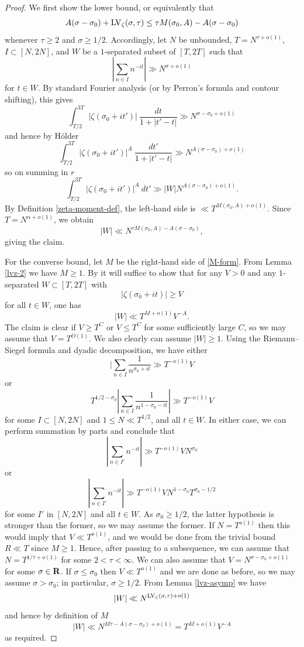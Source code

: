 \begin{proof}  We first show the lower bound, or equivalently that
$$ A(\sigma-\sigma_0) + \mathrm{LV}_\zeta(\sigma,\tau) \leq \tau M(\sigma_0,A) - A(\sigma-\sigma_0)$$
whenever $\tau \geq 2$ and $\sigma \geq 1/2$.  Accordingly, let $N$ be unbounded, $T = N^{\tau+o(1)}$, $I \subset [N,2N]$, and $W$ be a $1$-separated subset of $[T,2T]$ such that
$$ |\sum_{n \in I} n^{-it}| \gg N^{\sigma+o(1)}$$
for $t \in W$. By standard Fourier analysis (or by Perron's formula and contour shifting), this gives
$$ \int_{T/2}^{3T} |\zeta(\sigma_0+it')|\ \frac{dt}{1+|t'-t|} \gg N^{\sigma - \sigma_0 + o(1)}$$
and hence by H\"older
$$ \int_{T/2}^{3T} |\zeta(\sigma_0+it')|^A\ \frac{dt'}{1+|t'-t|} \gg N^{A(\sigma - \sigma_0) + o(1)}$$
so on summing in $r$
$$ \int_{T/2}^{3T} |\zeta(\sigma_0+it')|^A\ dt' \gg |W| N^{A(\sigma - \sigma_0) + o(1)}.$$
By Definition \ref{zeta-moment-def}, the left-hand side is $\ll T^{M(\sigma_0,A)+o(1)}$.  Since $T = N^{\alpha+o(1)}$, we obtain
$$ |W| \ll N^{\tau M(\sigma_0,A) - A(\sigma-\sigma_0)},$$
giving the claim.

For the converse bound, let $M$ be the right-hand side of \eqref{M-form}.  From Lemma \ref{lvz-2} we have $M \geq 1$. By \cite[\S 8.1]{ivic} it will suffice to show that for any $V>0$ and any $1$-separated $W \subset [T,2T]$ with
$$ |\zeta(\sigma_0+it)| \geq V$$
for all $t \in W$, one has
$$ |W| \ll T^{M+o(1)} V^{-A}.$$
The claim is clear if $V \geq T^C$ or $V \leq T^C$ for some sufficiently large $C$, so we may assume that $V = T^{O(1)}$.  We also clearly can assume $|W|\geq 1$.  Using the Riemann--Siegel formula \cite[Theorem 4.1]{ivic} and dyadic decomposition, we have either
$$ |\sum_{n \in I} \frac{1}{n^{\sigma_0+it}} \gg T^{-o(1)} V$$
or
$$ T^{1/2-\sigma_0} |\sum_{n \in I} \frac{1}{n^{1-\sigma_0-it}}| \gg T^{-o(1)} V$$
for some $I \subset [N,2N]$ and $1 \leq N \ll T^{1/2}$, and all $t \in W$.  In either case, we can perform summation by parts and conclude that
$$ |\sum_{n \in I'} n^{-it}|\gg T^{-o(1)} V N^{\sigma_0}$$
or
$$ |\sum_{n \in I'} n^{-it}|\gg T^{-o(1)} V N^{1-\sigma_0} T^{\sigma_0-1/2}$$
for some $I'$ in $[N,2N]$ and all $t \in W$.  As $\sigma_0 \geq 1/2$, the latter hypothesis is stronger than the former, so we may assume the former.  If $N = T^{o(1)}$ then this would imply that $V \ll T^{o(1)}$, and we would be done from the trivial bound $R \ll T$ since $M \geq 1$.
Hence, after passing to a subsequence, we can assume that $N = T^{1/\tau+o(1)}$ for some $2 < \tau < \infty$.  We can also assume that $V = N^{\sigma-\sigma_0+o(1)}$ for some $\sigma \in \mathbf{R}$. If $\sigma \leq \sigma_0$ then $V \ll T^{o(1)}$ and we are done as before, so we may assume $\sigma > \sigma_0$; in particular, $\sigma \geq 1/2$.  From Lemma \ref{lvz-asymp} we have
$$ |W| \ll N^{\mathrm{LV}_\zeta(\sigma,\tau)+o(1)}$$
and hence by definition of $M$
$$ |W| \ll N^{M \tau - A (\sigma-\sigma_0)+o(1)} = T^{M+o(1)} V^{-A}$$
as required.
\end{proof}

